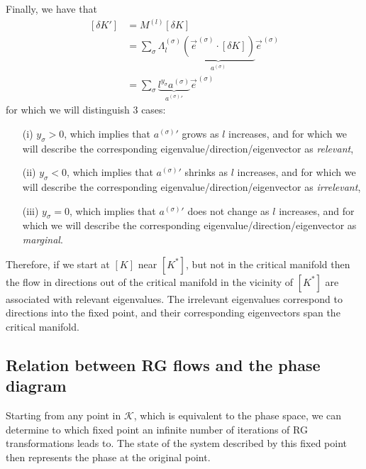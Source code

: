 \documentclass[class=report, float=false, crop=false]{standalone}
\begin{document}
Finally, we have that
\begin{equation}
\begin{aligned}
[\delta K'] &= M^{(l)} [\delta K]\\
&= \sum_{\sigma} \Lambda^{(\sigma)}_l \underbrace{\left(\vec{e}^{\hspace{1pt}(\sigma)}\cdot[\delta K]\right)}_{a^{(\sigma)}} \vec{e}^{\hspace{1pt}(\sigma)}\\
&= \sum_{\sigma} \underbrace{l^{y_{\sigma}}a^{(\sigma)}}_{\textstyle a^{(\sigma)}'} \vec{e}^{\hspace{1pt}(\sigma)}
\end{aligned}
\end{equation}
for which we will distinguish 3 cases:
\begin{itemize}
\item[(i)] $y_{\sigma} > 0$, which implies that $a^{(\sigma)}'$ grows as $l$ increases, and for which we will describe the corresponding eigenvalue/direction/eigenvector as \textit{relevant},
\item[(ii)] $y_{\sigma} < 0$, which implies that $a^{(\sigma)}'$ shrinks as $l$ increases, and for which we will describe the corresponding eigenvalue/direction/eigenvector as \textit{irrelevant},
\item[(iii)] $y_{\sigma} = 0$, which implies that $a^{(\sigma)}'$ does not change as $l$ increases, and for which we will describe the corresponding eigenvalue/direction/eigenvector as \textit{marginal}.
\end{itemize}
Therefore, if we start at $[K]$ near $[K^*]$, but not in the critical manifold then the flow in directions out of the critical manifold in the vicinity of $[K^*]$ are associated with relevant eigenvalues. The irrelevant eigenvalues correspond to directions into the fixed point, and their corresponding eigenvectors span the critical manifold.

\subsection{Relation between RG flows and the phase diagram}

Starting from any point in $\mathcal{K}$, which is equivalent to the phase space, we can determine to which fixed point an infinite number of iterations of RG transformations leads to. The state of the system described by this fixed point then represents the phase at the original point.\\
\end{document}
